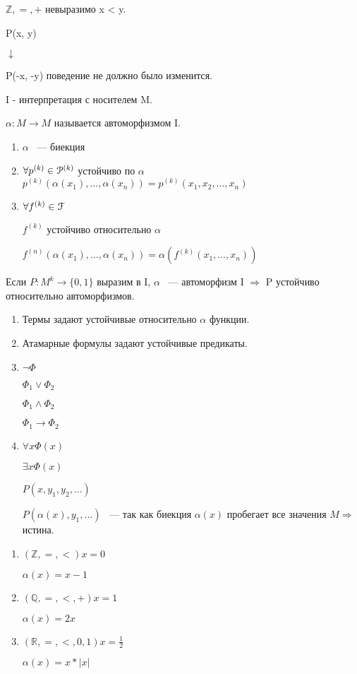 \documentclass[12pt]{article}
\begin{document}
\begin{description}

\item $\mathbb Z, =, +$ невыразимо x < y.

P(x, y)

$\downarrow$

P(-x, -y) поведение не должно было изменится. 

\item[Определение] I - интерпретация с носителем M.

$\alpha : M \to M$ называется автоморфизмом I.

\begin{enumerate}
\item $\alpha$ ~--- биекция
\item $\forall p^{(k)} \in \EuScript P^{(k)}$ устойчиво по $\alpha$ $p^{(k)}(\alpha(x_1), \ldots, \alpha(x_n)) = p^{(k)}(x_1, x_2, \ldots, x_n)$
\item $\forall f^{(k)} \in \EuScript F$

$f^{(k)}$ устойчиво относительно $\alpha$ 

$f^{(n)}(\alpha(x_1), \ldots, \alpha(x_n)) = \alpha(f^{(k)}(x_1, \ldots, x_n))$
\end{enumerate}

\item[Теорема]
    Если $P:M^k \to \{0, 1\}$ выразим в I, $\alpha$ ~--- автоморфизм I $\Rightarrow$ P устойчиво относительно автоморфизмов. 
\item[Доказательство]
\begin{enumerate}
\item Термы задают устойчивые относительно $\alpha$ функции.
\item Атамарные формулы задают устойчивые предикаты. 
\item $\neg \Phi$ 

$\Phi_1 \vee \Phi_2$

$\Phi_1 \wedge \Phi_2$

$\Phi_1 \to \Phi_2$

\item $\forall x \Phi(x)$

$\exists x \Phi(x)$

$P(x, y_1, y_2, \ldots)$

$P(\alpha(x), y_1, \ldots)$ ~--- так как биекция $\alpha (x)$ пробегает все значения $M \Rightarrow$ истина.
\end{enumerate}
\item[Примеры]
\begin{enumerate}
\item $(\mathbb Z,  =, <) x = 0$

$\alpha (x) = x - 1$

\item $(\mathbb Q,  =, <, +) x = 1$

$\alpha (x) = 2x$

\item $(\mathbb R,  =, <, 0, 1) x = \frac{1}{2}$

$\alpha (x) = x *|x|$
\end{enumerate}

\end{description}
\end{document}
